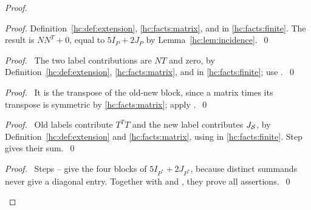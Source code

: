 \begin{mergedproofsection}
\begin{proof}
\begin{proof}
  Definition~\ref{hc:def:extension}, \ref{hc:facts:matrix}, and
   in \ref{hc:facts:finite}.
  The result is $NN^T+0$, equal to $5I_P+2J_P$ by
  Lemma~\ref{hc:lem:incidence}.~\qed\end{proof}
 \begin{proof}\pf\ The two label contributions are $NT$ and zero,
  by Definition~\ref{hc:def:extension}, \ref{hc:facts:matrix}, and
   in \ref{hc:facts:finite};
  use .~\qed\end{proof}
 \begin{proof}\pf\ It is the transpose of the old-new block,
  since a matrix times its transpose is symmetric by
  \ref{hc:facts:matrix}; apply .~\qed\end{proof}
 \begin{proof}\pf\ Old labels contribute $T^TT$ and the new label
  contributes $J_{{\mathcal S}}$, by Definition~\ref{hc:def:extension} and
  \ref{hc:facts:matrix}, using  in
  \ref{hc:facts:finite}. Step  gives their sum.~\qed\end{proof}
 \qedstep
 \begin{proof}\pf\ Steps --
  give the four blocks of $5I_{P^*}+2J_{P^*}$, because distinct
  summands never give a diagonal entry. Together with
   and , they prove all assertions.~\qed\end{proof}
\end{proof}


\end{mergedproofsection}
